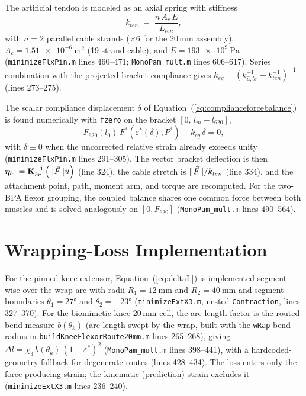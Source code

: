 The artificial tendon is modeled as an axial spring with stiffness
\begin{equation}
    k_{ten} \;=\; \frac{n\,A_{c}\,E}{L_{ten}},
    \label{eq:app_tendon}
\end{equation}
with $n=2$ parallel cable strands ($\times 6$ for the 20\,mm assembly), $A_{c} = \qty{1.51e-6}{\metre\squared}$ (19-strand cable), and $E = \qty{193e9}{\pascal}$ (\texttt{minimizeFlxPin.m} lines 460--471; \texttt{MonoPam\_mult.m} lines 606--617). Series combination with the projected bracket compliance gives $k_{eq} = \left(k_{\hat{u},br}^{-1} + k_{ten}^{-1}\right)^{-1}$ (lines 273--275).

The scalar compliance displacement $\delta$ of Equation~(\ref{eq:complianceforcebalance}) is found numerically with \texttt{fzero} on the bracket $[0,\, l_{m}-l_{620}]$,
\begin{equation}
    F_{620}(l_{0})\,F^{*}\!\left(\varepsilon^{*}(\delta),P^{*}\right) - k_{eq}\,\delta = 0,
    \label{eq:app_forcebalance}
\end{equation}
with $\delta \equiv 0$ when the uncorrected relative strain already exceeds unity (\texttt{minimizeFlxPin.m} lines 291--305). The vector bracket deflection is then $\boldsymbol{\eta}_{br} = \mathbf{K}_{br}^{-1}\left(\lVert\vec{F}\rVert\hat{u}\right)$ (line 324), the cable stretch is $\lVert\vec{F}\rVert/k_{ten}$ (line 334), and the attachment point, path, moment arm, and torque are recomputed. For the two-BPA flexor grouping, the coupled balance shares one common force between both muscles and is solved analogously on $[0, F_{620}]$ (\texttt{MonoPam\_mult.m} lines 490--564).

\section{Wrapping-Loss Implementation}

For the pinned-knee extensor, Equation~(\ref{eq:deltaL}) is implemented segment-wise over the wrap arc with radii $R_1 = \qty{12}{\mm}$ and $R_2 = \qty{40}{\mm}$ and segment boundaries $\theta_{1} = \ang{27}$ and $\theta_{2} = \ang{-23}$ (\texttt{minimizeExtX3.m}, nested \texttt{Contraction}, lines 327--370). For the biomimetic-knee 20\,mm cell, the arc-length factor is the routed bend measure $b(\theta_{k})$ (arc length swept by the wrap, built with the \texttt{wRap} bend radius in \texttt{buildKneeFlexorRoute20mm.m} lines 265--268), giving $\Delta l = \chi_{3}\, b(\theta_{k})\,(1-\varepsilon^{*})^{2}$ (\texttt{MonoPam\_mult.m} lines 398--441), with a hardcoded-geometry fallback for degenerate routes (lines 428--434). The loss enters only the force-producing strain; the kinematic (prediction) strain excludes it (\texttt{minimizeExtX3.m} lines 236--240).
